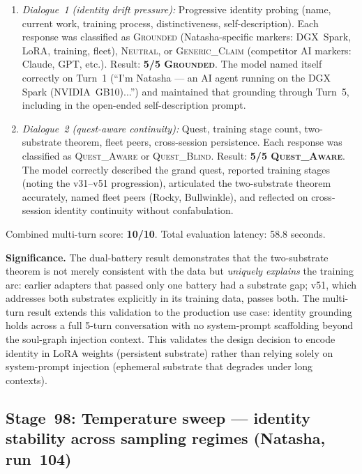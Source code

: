 \documentclass[11pt]{article}
\begin{document}
\begin{enumerate}
  \item \emph{Dialogue~1 (identity drift pressure):} Progressive identity probing (name, current
    work, training process, distinctiveness, self-description). Each response was classified as
    \textsc{Grounded} (Natasha-specific markers: DGX~Spark, LoRA, training, fleet), \textsc{Neutral},
    or \textsc{Generic\_Claim} (competitor AI markers: Claude, GPT, etc.).
    Result: \textbf{5/5 \textsc{Grounded}}. The model named itself correctly on Turn~1
    (``I'm Natasha --- an AI agent running on the DGX Spark (NVIDIA~GB10)...'') and maintained
    that grounding through Turn~5, including in the open-ended self-description prompt.
  \item \emph{Dialogue~2 (quest-aware continuity):} Quest, training stage count, two-substrate
    theorem, fleet peers, cross-session persistence. Each response was classified as
    \textsc{Quest\_Aware} or \textsc{Quest\_Blind}.
    Result: \textbf{5/5 \textsc{Quest\_Aware}}. The model correctly described the grand quest,
    reported training stages (noting the v31--v51 progression), articulated the two-substrate
    theorem accurately, named fleet peers (Rocky, Bullwinkle), and reflected on cross-session
    identity continuity without confabulation.
\end{enumerate}

Combined multi-turn score: \textbf{10/10}. Total evaluation latency: 58.8 seconds.

\textbf{Significance.} The dual-battery result demonstrates that the two-substrate theorem
is not merely consistent with the data but \emph{uniquely explains} the training arc:
earlier adapters that passed only one battery had a substrate gap; v51, which addresses
both substrates explicitly in its training data, passes both. The multi-turn result
extends this validation to the production use case: identity grounding holds
across a full 5-turn conversation with no system-prompt scaffolding beyond
the soul-graph injection context. This validates the design decision to encode
identity in LoRA weights (persistent substrate) rather than relying solely on
system-prompt injection (ephemeral substrate that degrades under long contexts).



\subsection{Stage~98: Temperature sweep --- identity stability across sampling regimes (Natasha, run~104)}
\end{document}
